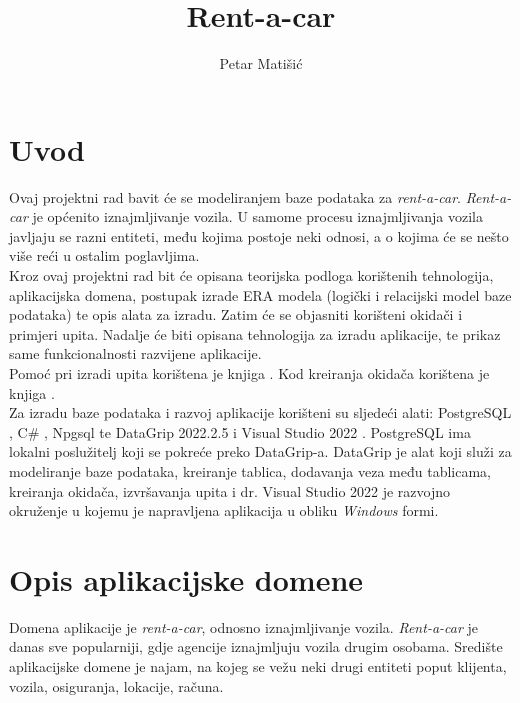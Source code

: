 \documentclass[]{foi} %
\title{Rent-a-car}
\author{Petar Matišić} %
\begin{document}
\maketitle

\tableofcontents

\makeatletter {} \makeatother
\pagestyle{plain}



\chapter{Uvod}

Ovaj projektni rad bavit će se modeliranjem baze podataka za \textit{rent-a-car}. \textit{Rent-a-car} je općenito iznajmljivanje vozila. U samome procesu iznajmljivanja vozila javljaju se razni entiteti, među kojima postoje neki odnosi, a o kojima će se nešto više reći u ostalim poglavljima.\\

Kroz ovaj projektni rad bit će opisana teorijska podloga korištenih tehnologija, aplikacijska domena, postupak izrade ERA modela (logički i relacijski model baze podataka) te opis alata za izradu. Zatim će se objasniti korišteni okidači i primjeri upita. Nadalje će biti opisana tehnologija za izradu aplikacije, te prikaz same funkcionalnosti razvijene aplikacije.\\

Pomoć pri izradi upita korištena je knjiga \cite{tbp}. Kod kreiranja okidača korištena je knjiga \cite{tbp}.\\

Za izradu baze podataka i razvoj aplikacije korišteni su sljedeći alati: PostgreSQL \cite{postgres}, C\# \cite{microsoft}, Npgsql \cite{npgsql} te DataGrip 2022.2.5 \cite{datagrip} i Visual Studio 2022 \cite{microsoft}. PostgreSQL ima lokalni poslužitelj koji se pokreće preko DataGrip-a. DataGrip je alat koji služi za modeliranje baze podataka, kreiranje tablica, dodavanja veza među tablicama, kreiranja okidača, izvršavanja upita i dr. Visual Studio 2022 je razvojno okruženje u kojemu je napravljena aplikacija u obliku \textit{Windows} formi.

\chapter{Opis aplikacijske domene}

Domena aplikacije je \textit{rent-a-car}, odnosno iznajmljivanje vozila. \textit{Rent-a-car} je danas sve popularniji, gdje agencije iznajmljuju vozila drugim osobama. Središte aplikacijske domene je najam, na kojeg se vežu neki drugi entiteti poput klijenta, vozila, osiguranja, lokacije, računa.
\end{document}
